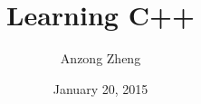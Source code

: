 \documentclass[10pt,a4paper]{book}
\begin{document}
\author{Anzong Zheng}
\title{Learning C++}
\date{January 20, 2015}
\maketitle
	
\tableofcontents
	
\newpage


















\end{document}
